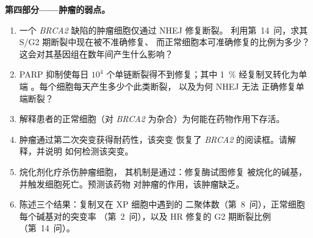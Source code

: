 \begin{problem}
\medskip
\noindent\textbf{第四部分——肿瘤的弱点。}
\begin{enumerate}[resume]
  \item 一个 \emph{BRCA2} 缺陷的肿瘤细胞仅通过 NHEJ 修复断裂。
        利用第~14~问，求其 S/G2 期断裂中现在被不准确修复、
        而正常细胞本可准确修复的比例为多少？
        这会对其基因组在数年间产生什么影响？
  \item PARP 抑制使每日 $10^{4}$ 个单链断裂得不到修复；其中
        \qty{1}{\%} 经复制叉转化为单端
        。每个细胞每天产生多少个此类断裂，
        以及为何 NHEJ 无法
        正确修复单端断裂？
  \item 解释患者的正常细胞（对
        \emph{BRCA2} 为杂合）为何能在药物作用下存活。
  \item 肿瘤通过第二次突变获得耐药性，该突变
        恢复了 \emph{BRCA2} 的阅读框。请解释，并说明
        如何检测该突变。
  \item 烷化剂化疗杀伤肿瘤细胞，
        其机制是通过：修复酶试图修复
        被烷化的碱基，并触发细胞死亡。预测该药物
        对肿瘤的作用，该肿瘤缺乏。
  \item 陈述三个结果：复制叉在 XP 细胞中遇到的
        二聚体数（第~8~问），正常细胞每个碱基对的突变率
        （第~2~问），以及 HR 修复的 G2 期断裂比例
        （第~14~问）。
\end{enumerate}
\end{problem}
